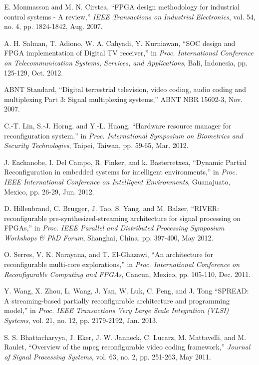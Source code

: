 \begin{thebibliography}{}
E. Monmasson and M. N. Cirstea, ``FPGA design methodology for industrial control systems - A review,'' \emph{IEEE Transactions on Industrial Electronics}, vol. 54, no. 4, pp. 1824-1842, Aug. 2007.
	
A. H. Salman, T.  Adiono,  W. A. Cahyadi,  Y. Kurniawan, ``SOC design and FPGA implementation of Digital TV receiver,'' in \emph{Proc. International Conference on Telecommunication Systems, Services, and Applications}, Bali, Indonesia, pp. 125-129, Oct. 2012.
	
ABNT Standard, ``Digital terrestrial television, video coding, audio coding and multiplexing Part 3: Signal multiplexing systems,'' ABNT NBR 15602-3, Nov. 2007.
	
C.-T. Lin, S.-J. Horng, and Y.-L. Huang, ``Hardware resource manager for reconfiguration system,'' in \emph{Proc. International Symposium on Biometrics and Security Technologies}, Taipei, Taiwan, pp. 59-65, Mar. 2012.
		
J. Eachanobe, I. Del Campo, R. Finker, and k. Basterretxea, ``Dynamic Partial Reconfiguration in embedded systems for intelligent environments,'' in \emph{Proc. IEEE International Conference on Intelligent Environments}, Guanajuato, Mexico, pp. 26-29, Jun. 2012.
	
D. Hillenbrand, C. Brugger, J. Tao, S. Yang, and M. Balzer, ``RIVER: reconfigurable pre-synthesized-streaming architecture for signal processing on FPGAs,'' in \emph{Proc. IEEE Parallel and Distributed Processing Symposium Workshops \& PhD Forum}, Shanghai, China, pp. 397-400, May 2012.

O. Serres, V. K. Narayana, and T. El-Ghazawi, ``An architecture for reconfigurable multi-core explorations,'' in \emph{Proc. International Conference on Reconfigurable Computing and FPGAs}, Cancun, Mexico, pp. 105-110, Dec. 2011.

Y. Wang, X. Zhou, L. Wang, J. Yan, W. Luk, C. Peng, and J. Tong ``SPREAD: A streaming-based partially reconfigurable architecture and programming model,'' in \emph{Proc. IEEE Transactions Very Large Scale Integration (VLSI) Systems}, vol. 21, no. 12, pp. 2179-2192, Jan. 2013.

S. S. Bhattacharyya, J. Eker, J. W. Janneck, C. Lucarz, M. Mattavelli, and M. Raulet, ``Overview of the mpeg reconfigurable video coding framework,'' \emph{Journal of Signal Processing Systems}, vol. 63, no. 2, pp. 251-263, May 2011.


\end{thebibliography}
